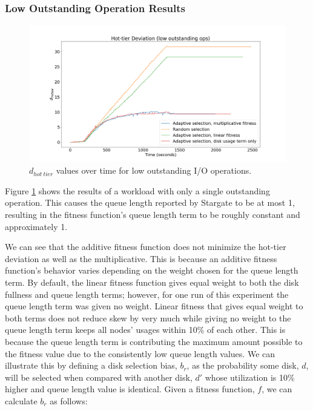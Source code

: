 \documentclass[12pt]{article}
\begin{document}

    \subsubsection{Low Outstanding Operation Results}

    \begin{figure}[h]
      \centering
      \includegraphics[scale=0.32]{images/low_outstanding_exp.png} 
      \caption{$d_{hot\ tier}$ values over time for low outstanding I/O
               operations.}
      \label{fig:low_outstanding_tier_disparity}
    \end{figure}

    Figure \ref{fig:low_outstanding_tier_disparity} shows the results of a
    workload with only a single outstanding operation. This causes the queue
    length reported by Stargate to be at most 1, resulting in the fitness
    function's queue length term to be roughly constant and approximately 1.
    
    We can see that the additive fitness function does not minimize the
    hot-tier deviation as well as the multiplicative. This is because an
    additive fitness function's behavior varies depending on the weight chosen
    for the queue length term. By default, the linear fitness function
    gives equal weight to both the disk fullness and queue length terms;
    however, for one run of this experiment the queue length term was given no
    weight. Linear fitness that gives equal weight to both terms does not
    reduce skew by very much while giving no weight to the queue length term
    keeps all nodes' usages within 10\% of each other. This is because the
    queue length term is contributing the maximum amount possible to the
    fitness value due to the consistently low queue length values. We can
    illustrate this by defining a disk selection bias, $b_r$, as the
    probability some disk, $d$, will be selected when compared with another
    disk, $d'$ whose utilization is 10\% higher and queue length value is
    identical. Given a fitness function, $f$, we can calculate $b_r$ as
    follows:
\end{document}
